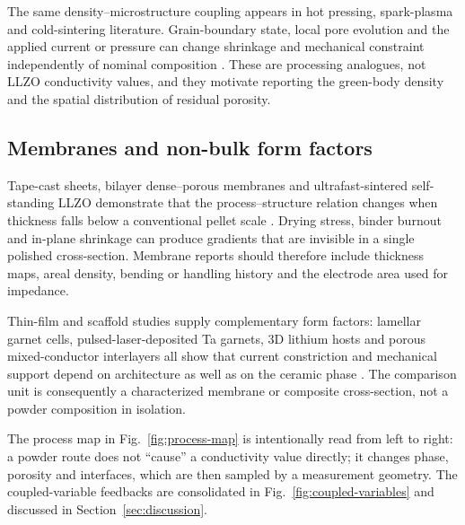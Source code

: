 The same density--microstructure coupling appears in hot pressing, spark-plasma and cold-sintering literature. Grain-boundary state, local pore evolution and the applied current or pressure can change shrinkage and mechanical constraint independently of nominal composition \cite{ni2012room,srivastav2020localized,srivastav2020microstructure,orru2009consolidation,galotta2021the,cai2023microstructure}. These are processing analogues, not LLZO conductivity values, and they motivate reporting the green-body density and the spatial distribution of residual porosity.

\subsection{Membranes and non-bulk form factors}

Tape-cast sheets, bilayer dense--porous membranes and ultrafast-sintered self-standing LLZO demonstrate that the process--structure relation changes when thickness falls below a conventional pellet scale \cite{gao2019preparation,ye2020water,zhang2023bilayer,zhang2023ultrafast,touidjine2026tapex}. Drying stress, binder burnout and in-plane shrinkage can produce gradients that are invisible in a single polished cross-section. Membrane reports should therefore include thickness maps, areal density, bending or handling history and the electrode area used for impedance.

Thin-film and scaffold studies supply complementary form factors: lamellar garnet cells, pulsed-laser-deposited Ta garnets, 3D lithium hosts and porous mixed-conductor interlayers all show that current constriction and mechanical support depend on architecture as well as on the ceramic phase \cite{du2015all,reinacher2014preparation,liu20183d,li20223d,kim2021porous}. The comparison unit is consequently a characterized membrane or composite cross-section, not a powder composition in isolation.

The process map in Fig.~\ref{fig:process-map} is intentionally read from left to right: a powder route does not “cause” a conductivity value directly; it changes phase, porosity and interfaces, which are then sampled by a measurement geometry. The coupled-variable feedbacks are consolidated in Fig.~\ref{fig:coupled-variables} and discussed in Section~\ref{sec:discussion}.

